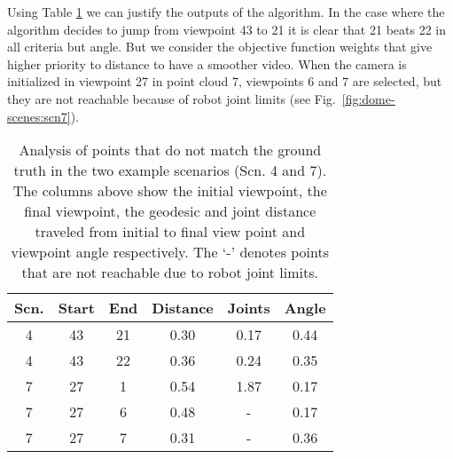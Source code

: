 \documentclass[10pt,twocolumn,letterpaper]{article}
\begin{document}
Using Table \ref{tab:error-analysis} we can justify the outputs of the algorithm. In the case where the algorithm decides to jump from viewpoint 43 to 21 it is clear that 21 beats 22 in all criteria but angle. But we consider the objective function weights that give higher priority to distance to have a smoother video. When the camera is initialized in viewpoint 27 in point cloud 7, viewpoints 6 and 7 are selected, but they are not reachable because of robot joint limits (see Fig.~\ref{fig:dome-scenes:scn7}). 
\begin{table}
\begin{center}
\begin{tabular}{|c|cc|ccc|}
\hline
Scn. & Start & End & Distance & Joints & Angle \\ \hline \hline
4      & 43        & 21       & 0.30  & 0.17     & 0.44  \\
4      & 43        & 22       & 0.36  & 0.24     & 0.35  \\
7      & 27        & 1        & 0.54  & 1.87     & 0.17  \\
7      & 27        & 6        & 0.48  & -      & 0.17  \\
7      & 27        & 7        & 0.31  & -      & 0.36  \\ \hline
\end{tabular}
\end{center}
\caption{Analysis of points that do not match the ground truth in the two example scenarios (Scn. 4 and 7).
The columns above show the initial viewpoint, the final viewpoint, the geodesic and joint distance traveled from initial to final view point and viewpoint angle respectively.
The `-' denotes points that are not reachable due to robot joint limits.}
\label{tab:error-analysis}
\end{table}
\end{document}
